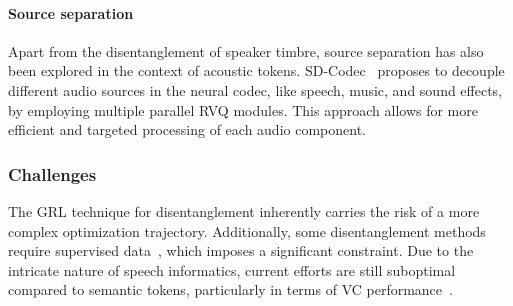 \paragraph{Source separation}
Apart from the disentanglement of speaker timbre, source separation has also been explored in the context of acoustic tokens.
SD-Codec~\cite{bie2024learning} proposes to decouple different audio sources in the neural codec, like speech, music, and sound effects, by employing  multiple parallel RVQ modules.
This approach allows for more efficient and targeted processing of each audio component.

\subsubsection{Challenges}
The GRL technique for disentanglement inherently carries the risk of a more complex optimization trajectory.
Additionally, some disentanglement methods require supervised data~\cite{facodec}, which imposes a significant constraint.
Due to the intricate nature of speech informatics, current efforts are still suboptimal compared to semantic tokens, particularly in terms of VC performance~\cite{guo2024lscodec}.
